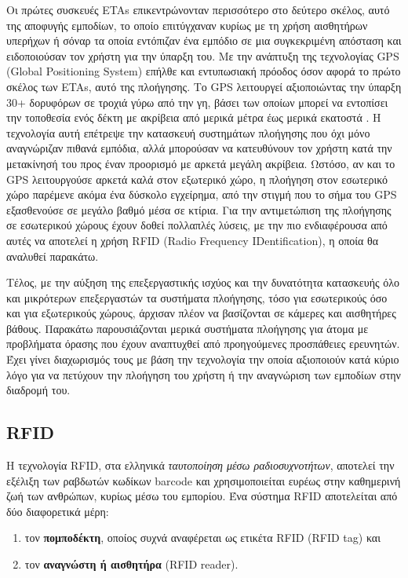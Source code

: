 Οι πρώτες συσκευές ETAs επικεντρώνονταν περισσότερο στο δεύτερο σκέλος, αυτό της αποφυγής εμποδίων, το οποίο επιτύγχαναν κυρίως με τη χρήση αισθητήρων υπερήχων ή σόναρ τα οποία εντόπιζαν ένα εμπόδιο σε μια συγκεκριμένη απόσταση και ειδοποιούσαν τον χρήστη για την ύπαρξη του. Με την ανάπτυξη της τεχνολογίας GPS (Global Positioning System) επήλθε και εντυπωσιακή πρόοδος όσον αφορά το πρώτο σκέλος των ETAs, αυτό της πλοήγησης. Το GPS λειτουργεί αξιοποιώντας την ύπαρξη 30+ δορυφόρων σε τροχιά γύρω από την γη, βάσει των οποίων μπορεί να εντοπίσει την τοποθεσία ενός δέκτη με ακρίβεια από μερικά μέτρα έως μερικά εκατοστά \cite{gps}. Η τεχνολογία αυτή επέτρεψε την κατασκευή συστημάτων πλοήγησης που όχι μόνο αναγνώριζαν πιθανά εμπόδια, αλλά μπορούσαν να κατευθύνουν τον χρήστη κατά την μετακίνησή του προς έναν προορισμό με αρκετά μεγάλη ακρίβεια. Ωστόσο, αν και το GPS λειτουργούσε αρκετά καλά στον εξωτερικό χώρο, η πλοήγηση στον εσωτερικό χώρο παρέμενε ακόμα ένα δύσκολο εγχείρημα, από την στιγμή που το σήμα του GPS εξασθενούσε σε μεγάλο βαθμό μέσα σε κτίρια. Για την αντιμετώπιση της πλοήγησης σε εσωτερικού χώρους έχουν δοθεί πολλαπλές λύσεις, με την πιο ενδιαφέρουσα από αυτές να αποτελεί η χρήση RFID (Radio Frequency IDentification), η οποία θα αναλυθεί παρακάτω. 

Τέλος, με την αύξηση της επεξεργαστικής ισχύος και την δυνατότητα κατασκευής όλο και μικρότερων επεξεργαστών τα συστήματα πλοήγησης, τόσο για εσωτερικούς όσο και για εξωτερικούς χώρους, άρχισαν πλέον να βασίζονται σε κάμερες και αισθητήρες βάθους. Παρακάτω παρουσιάζονται μερικά συστήματα πλοήγησης για άτομα με προβλήματα όρασης που έχουν αναπτυχθεί από προηγούμενες προσπάθειες ερευνητών. Έχει γίνει διαχωρισμός τους με βάση την τεχνολογία την οποία αξιοποιούν κατά κύριο λόγο για να πετύχουν την πλοήγηση του χρήστη ή την αναγνώριση των εμποδίων στην διαδρομή του.

\subsection{RFID}
Η τεχνολογία RFID, στα ελληνικά \textit{ταυτοποίηση μέσω ραδιοσυχνοτήτων}, αποτελεί την εξέλιξη των ραβδωτών κωδίκων barcode και χρησιμοποιείται ευρέως στην καθημερινή ζωή των ανθρώπων, κυρίως μέσω του εμπορίου. Ένα σύστημα RFID αποτελείται από δύο διαφορετικά μέρη:
\begin{enumerate}
    \item τον \textbf{πομποδέκτη}, οποίος συχνά αναφέρεται ως ετικέτα RFID (RFID tag) και
    \item τον \textbf{αναγνώστη ή αισθητήρα} (RFID reader).
\end{enumerate}

